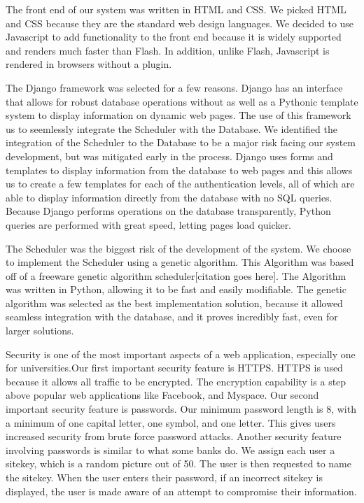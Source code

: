 \documentclass[12pt]{article}
\begin{document}
The front end of our system was written in HTML and CSS. We picked HTML and CSS because they are the standard web design languages. We decided to use Javascript to add functionality to the front end because it is widely supported and renders much faster than Flash. In addition, unlike Flash, Javascript is rendered in browsers without a plugin.

The Django framework was selected for a few reasons. Django has an interface that allows for robust database operations without as well as a Pythonic template system to display information on dynamic web pages. The use of this framework us to seemlessly integrate the Scheduler with the Database. We identified the integration of the Scheduler to the Database to be a major risk facing our system development, but was mitigated early in the process. Django uses forms and templates to display information from the database to web pages and this allows us to create a few templates for each of the authentication levels, all of which are able to display information directly from the database with no SQL queries. Because Django performs operations on the database transparently, Python queries are performed with great speed, letting pages load quicker. %

The Scheduler was the biggest risk of the development of the system. We choose to implement the Scheduler using a genetic algorithm. This Algorithm was based off of a freeware genetic algorithm scheduler[citation goes here]. The Algorithm was written in Python, allowing it to be fast and easily modifiable. The genetic algorithm was selected as the best implementation solution, because it allowed seamless integration with the database, and it proves incredibly fast, even for larger solutions.%

Security is one of the most important aspects of a web application, especially one for universities.Our first important security feature is HTTPS. HTTPS is used because it allows all traffic to be encrypted. The encryption capability is a step above popular web applications like Facebook, and Myspace. Our second important security feature is passwords. Our minimum password length is 8, with a minimum of one capital letter, one symbol, and one letter. This gives users increased security from brute force password attacks. Another security feature involving passwords is similar to what some banks do. We assign each user a sitekey, which is a random picture out of 50. The user is then requested to name the sitekey. When the user enters their password, if an incorrect sitekey is displayed, the user is made aware of an attempt to compromise their information. 
\end{document}
